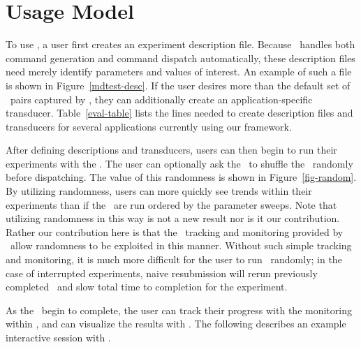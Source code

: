 \section{Usage Model}
\label{eval}



To use \name, a user first creates an experiment description file.  Because
\name\ handles both command generation and command dispatch automatically,
these description files need merely identify parameters and values of interest.
An example of such a file is shown in Figure~\ref{mdtest-desc}.  If the user
desires more than the default set of \kv\ pairs captured by \name, they can
additionally create an application-specific transducer.  Table~\ref{eval-table} 
lists the lines needed to create description files and transducers for
several applications currently using our framework.  

After defining descriptions and transducers, users can then begin to run their
experiments with the \dispatcher.  The user can optionally ask the \dispatcher\
to shuffle the \subs\ randomly before dispatching.  The value of this
randomness is shown in Figure~\ref{fig-random}.  By utilizing randomness, users
can more quickly see trends within their experiments than if the \subs\ are run
ordered by the parameter sweeps.  Note that utilizing randomness in this way is
not a new result nor is it our contribution.  Rather our contribution here is
that the \sub\ tracking and monitoring provided by \name\ allow randomness to
be exploited in this manner.  Without such simple tracking and monitoring, it
is much more difficult for the user to run \subs\ randomly; in the case of
interrupted experiments, naive resubmission will rerun previously completed
\subs\ and slow total time to completion for the experiment. 

As the \subs\ begin to complete, the user can track their progress with the
monitoring within \name, and can visualize the results with \dbviz.  The
following describes an example interactive session with \dbviz.

